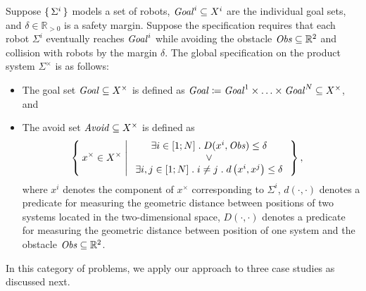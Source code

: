 Suppose $\set{\Sigma^i}$ 
models a set of robots, 
$\mathit{Goal}^i\subseteq X^i$ are the individual goal sets, and $\delta \in \mathbb{R}_{>0}$ is a safety margin.
Suppose the specification requires that each robot $\Sigma^i$ eventually reaches $\mathit{Goal}^i$ 
while avoiding the obstacle $\mathit{Obs}\subseteq \mathbb{R}^2$ and collision with robots by the margin $\delta$.
The global specification on the product system $\Sigma^\times$ 
is as follows:
\begin{itemize}
	\item The goal set $\mathit{Goal}\subseteq X^\times$ is defined as $\mathit{Goal} \coloneqq \mathit{Goal}^1\times \ldots \times \mathit{Goal}^N \subseteq X^\times$, and
	\item The avoid set $\mathit{Avoid}\subseteq X^\times$ is defined as 
		\begin{align}
				&\Set{ x^\times\in X^\times | 
					\begin{array}{c}
						\exists i\in [1;N]\;.\; D(x^i,\mathit{Obs}) \leq \delta\\
						\vee\\
						 \exists i,j\in [1;N]\;.\;i\neq j\;.\;d\left(x^i,x^j\right)\leq\delta
					\end{array}},
		\end{align}
	where $x^i$ denotes the component of $x^\times$ corresponding to $\Sigma^i$, $d(\cdot,\cdot)$ denotes a predicate for measuring the geometric distance between positions of two systems located in the two-dimensional space, $D(\cdot,\cdot)$ denotes a predicate for measuring the geometric distance between position of one system and the obstacle $\mathit{Obs}\subseteq \mathbb{R}^2$.
\end{itemize}
%
%
In this category of problems, we apply our approach to three case studies as discussed next.

